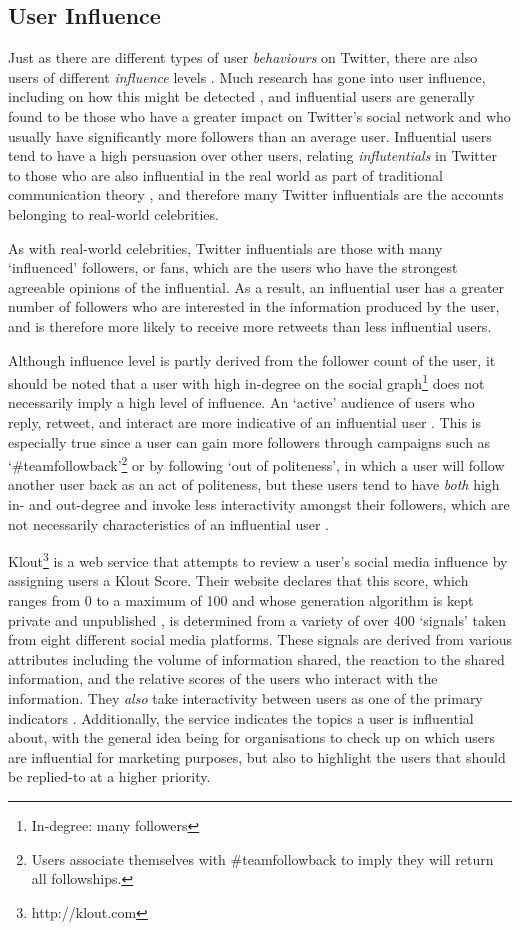 \subsection{User Influence}
Just as there are different types of user \textit{behaviours} on Twitter, there are also users of different \textit{influence} levels \cite{quercia11}. Much research has gone into user influence, including on how this might be detected \cite{yu11}, and influential users are generally found to be those who have a greater impact on Twitter's social network \cite{bakshy11} and who usually have significantly more followers than an average user. Influential users tend to have a high persuasion over other users, relating \textit{influtentials} in Twitter to those who are also influential in the real world as part of traditional communication theory \cite{cha10}, and therefore many Twitter influentials are the accounts belonging to real-world celebrities.

As with real-world celebrities, Twitter influentials are those with many `influenced' followers, or fans, which are the users who have the strongest agreeable opinions of the influential. As a result, an influential user has a greater number of followers who are interested in the information produced by the user, and is therefore more likely to receive more retweets than less influential users.

Although influence level is partly derived from the follower count of the user, it should be noted that a user with high in-degree on the social graph\footnote{In-degree: many followers} does not necessarily imply a high level of influence. An `active' audience of users who reply, retweet, and interact are more indicative of an influential user \cite{bigonha10}. This is especially true since a user can gain more followers through campaigns such as `\#teamfollowback'\footnote{Users associate themselves with \#teamfollowback to imply they will return all followships.} or by following `out of politeness', in which a user will follow another user back as an act of politeness, but these users tend to have \textit{both} high in- and out-degree and invoke less interactivity amongst their followers, which are not necessarily characteristics of an influential user \cite{cha10}.

Klout\footnote{http://klout.com} is a web service that attempts to review a user's social media influence by assigning users a Klout Score. Their website declares that this score, which ranges from 0 to a maximum of 100 and whose generation algorithm is kept private and unpublished \cite{edwards13}, is determined from a variety of over 400 `signals' taken from eight different social media platforms. These signals are derived from various attributes including the volume of information shared, the reaction to the shared information, and the relative scores of the users who interact with the information. They \textit{also} take interactivity between users as one of the primary indicators \cite{anger11}. Additionally, the service indicates the topics a user is influential about, with the general idea being for organisations to check up on which users are influential for marketing purposes, but also to highlight the users that should be replied-to at a higher priority.


